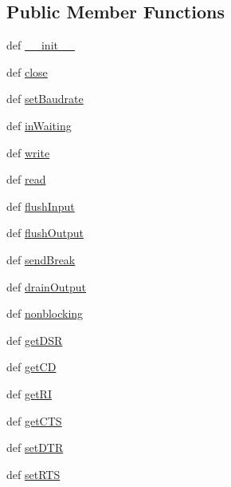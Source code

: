 \subsection*{Public Member Functions}
\begin{DoxyCompactItemize}
\item 
def \hyperlink{classserial_1_1serialposix_1_1_serial_afbf64348bdf4cbd3b0356e379368950f}{\-\_\-\-\_\-init\-\_\-\-\_\-}
\item 
def \hyperlink{classserial_1_1serialposix_1_1_serial_a160bf0d6861849ee0440bb412bb67ca0}{close}
\item 
def \hyperlink{classserial_1_1serialposix_1_1_serial_ac120a2512d88d1f4453871333f92810e}{set\-Baudrate}
\item 
def \hyperlink{classserial_1_1serialposix_1_1_serial_a281c188a874885c0e51bd50de009b2a4}{in\-Waiting}
\item 
def \hyperlink{classserial_1_1serialposix_1_1_serial_a5f3906413ea14066492e007680c517d8}{write}
\item 
def \hyperlink{classserial_1_1serialposix_1_1_serial_a173d66c3d3cd356d8f90b51f0f750604}{read}
\item 
def \hyperlink{classserial_1_1serialposix_1_1_serial_ae4f788d9e8ae622f69731582aa5fd7dc}{flush\-Input}
\item 
def \hyperlink{classserial_1_1serialposix_1_1_serial_ad77f302127b94b0d1cdf8e8019aae4fc}{flush\-Output}
\item 
def \hyperlink{classserial_1_1serialposix_1_1_serial_a3c7d86701aef4760ce693fc76512065f}{send\-Break}
\item 
def \hyperlink{classserial_1_1serialposix_1_1_serial_a92d20409acba15e0f907a91c91172c16}{drain\-Output}
\item 
def \hyperlink{classserial_1_1serialposix_1_1_serial_a83cbe476662a8ed062eb483ad9c571d0}{nonblocking}
\item 
def \hyperlink{classserial_1_1serialposix_1_1_serial_a33c1bc242b4a5ed5f872fe20e9b95f44}{get\-D\-S\-R}
\item 
def \hyperlink{classserial_1_1serialposix_1_1_serial_afe7450ca115457d4cf8a05e28565b071}{get\-C\-D}
\item 
def \hyperlink{classserial_1_1serialposix_1_1_serial_af2319eee15459a274c33512b5f3e162d}{get\-R\-I}
\item 
def \hyperlink{classserial_1_1serialposix_1_1_serial_ac837d511bbdf6af08ce0fa42789e0dc4}{get\-C\-T\-S}
\item 
def \hyperlink{classserial_1_1serialposix_1_1_serial_a47a43e9a8ef8e589d72b1d65c5ed7c00}{set\-D\-T\-R}
\item 
def \hyperlink{classserial_1_1serialposix_1_1_serial_aa75c59e677d9e641fb371df1a41d5d6f}{set\-R\-T\-S}
\end{DoxyCompactItemize}
